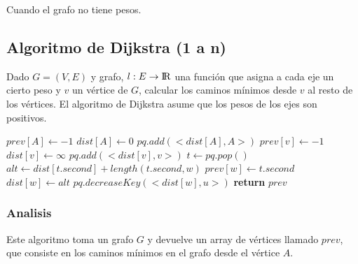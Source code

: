 Cuando el grafo no tiene pesos.

\newpage
\subsection{Algoritmo de Dijkstra (1 a n)}

Dado $G = (V, E)$ y grafo, $l: E \rightarrow {\rm I\!R}$ una funci\'on que asigna a cada eje un cierto peso y $v$ un v\'ertice de $G$, calcular los caminos m\'inimos desde $v$ al resto de los v\'ertices. El algoritmo de Dijkstra asume que los pesos de los ejes son positivos.

\begin{algorithm}
\begin{algorithmic}[1]
  \State $prev[A] \gets -1$
  \State $dist[A] \gets 0$
  \State $pq.add(<dist[A], A>)$
    \State $prev[v] \gets -1$
    \State $dist[v] \gets \infty$
    \State $pq.add(<dist[v], v>)$
  \EndFor
    \State $t \gets pq.pop()$
      \State $alt \gets dist[t.second] + length(t.second, w)$
        \State $prev[w] \gets t.second$
        \State $dist[w] \gets alt$
        \State $pq.decreaseKey(<dist[w], u>)$
      \EndIf
    \EndFor
  \EndWhile
  \State \textbf{return} $prev$
\EndFunction
\end{algorithmic}
\end{algorithm}

\subsubsection*{Analisis}

Este algoritmo toma un grafo $G$ y devuelve un array de v\'ertices llamado $prev$, que consiste en los caminos m\'inimos en el grafo desde el v\'ertice $A$.

